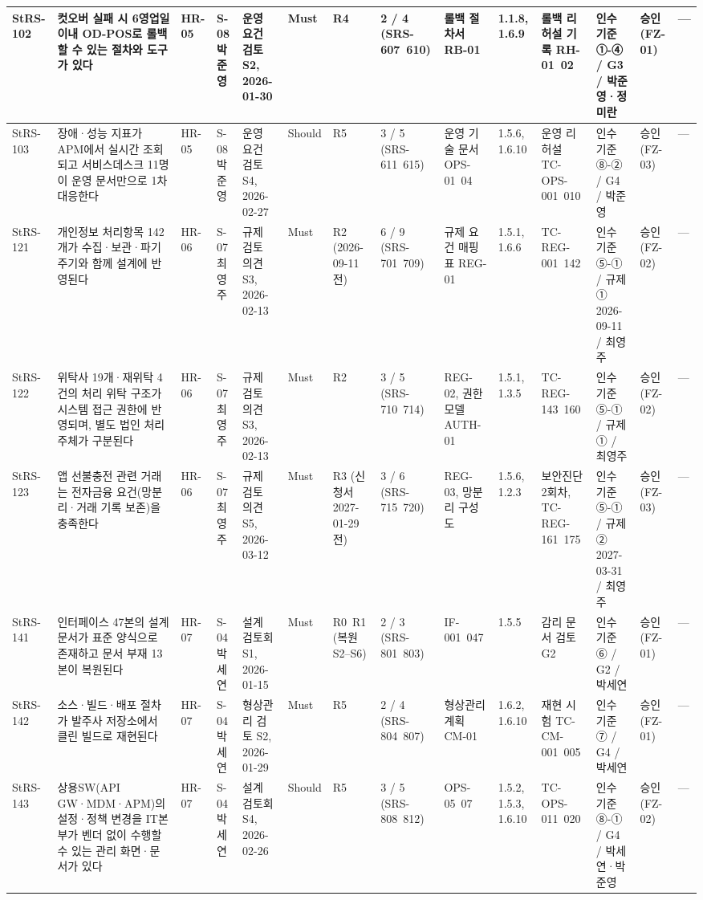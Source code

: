 \documentclass[10pt,a4paper]{article}
\begin{document}
{\begin{longtable}{|L{11mm}|L{42mm}|L{9mm}|L{15mm}|L{16mm}|L{11mm}|L{12mm}|L{15mm}|L{18mm}|L{12mm}|L{19mm}|L{22mm}|L{11mm}|L{22mm}|}
StRS-102 & 컷오버 실패 시 6영업일 이내 OD-POS로 롤백할 수 있는 절차와 도구가 있다 & HR-05 & S-08 박준영 & 운영 요건 검토 S2, 2026-01-30 & Must & R4 & 2 / 4 (SRS-607~610) & 롤백 절차서 RB-01 & 1.1.8, 1.6.9 & 롤백 리허설 기록 RH-01~02 & 인수 기준 ①-④ / G3 / 박준영·정미란 & 승인 (FZ-01) & — \\ \hline
StRS-103 & 장애·성능 지표가 APM에서 실시간 조회되고 서비스데스크 11명이 운영 문서만으로 1차 대응한다 & HR-05 & S-08 박준영 & 운영 요건 검토 S4, 2026-02-27 & Should & R5 & 3 / 5 (SRS-611~615) & 운영 기술 문서 OPS-01~04 & 1.5.6, 1.6.10 & 운영 리허설 TC-OPS-001~010 & 인수 기준 ⑧-② / G4 / 박준영 & 승인 (FZ-03) & — \\ \hline
StRS-121 & 개인정보 처리항목 142개가 수집·보관·파기 주기와 함께 설계에 반영된다 & HR-06 & S-07 최영주 & 규제 검토 의견 S3, 2026-02-13 & Must & R2 (2026-09-11 전) & 6 / 9 (SRS-701~709) & 규제 요건 매핑표 REG-01 & 1.5.1, 1.6.6 & TC-REG-001~142 & 인수 기준 ⑤-① / 규제 ① 2026-09-11 / 최영주 & 승인 (FZ-02) & — \\ \hline
StRS-122 & 위탁사 19개·재위탁 4건의 처리 위탁 구조가 시스템 접근 권한에 반영되며, 별도 법인 처리 주체가 구분된다 & HR-06 & S-07 최영주 & 규제 검토 의견 S3, 2026-02-13 & Must & R2 & 3 / 5 (SRS-710~714) & REG-02, 권한 모델 AUTH-01 & 1.5.1, 1.3.5 & TC-REG-143~160 & 인수 기준 ⑤-① / 규제 ① / 최영주 & 승인 (FZ-02) & — \\ \hline
StRS-123 & 앱 선불충전 관련 거래는 전자금융 요건(망분리·거래 기록 보존)을 충족한다 & HR-06 & S-07 최영주 & 규제 검토 의견 S5, 2026-03-12 & Must & R3 (신청서 2027-01-29 전) & 3 / 6 (SRS-715~720) & REG-03, 망분리 구성도 & 1.5.6, 1.2.3 & 보안진단 2회차, TC-REG-161~175 & 인수 기준 ⑤-① / 규제 ② 2027-03-31 / 최영주 & 승인 (FZ-03) & — \\ \hline
StRS-141 & 인터페이스 47본의 설계문서가 표준 양식으로 존재하고 문서 부재 13본이 복원된다 & HR-07 & S-04 박세연 & 설계 검토회 S1, 2026-01-15 & Must & R0~R1 (복원 S2–S6) & 2 / 3 (SRS-801~803) & IF-001~047 & 1.5.5 & 감리 문서 검토 G2 & 인수 기준 ⑥ / G2 / 박세연 & 승인 (FZ-01) & — \\ \hline
StRS-142 & 소스·빌드·배포 절차가 발주사 저장소에서 클린 빌드로 재현된다 & HR-07 & S-04 박세연 & 형상관리 검토 S2, 2026-01-29 & Must & R5 & 2 / 4 (SRS-804~807) & 형상관리 계획 CM-01 & 1.6.2, 1.6.10 & 재현 시험 TC-CM-001~005 & 인수 기준 ⑦ / G4 / 박세연 & 승인 (FZ-01) & — \\ \hline
StRS-143 & 상용SW(API GW·MDM·APM)의 설정·정책 변경을 IT본부가 벤더 없이 수행할 수 있는 관리 화면·문서가 있다 & HR-07 & S-04 박세연 & 설계 검토회 S4, 2026-02-26 & Should & R5 & 3 / 5 (SRS-808~812) & OPS-05~07 & 1.5.2, 1.5.3, 1.6.10 & TC-OPS-011~020 & 인수 기준 ⑧-① / G4 / 박세연·박준영 & 승인 (FZ-02) & — \\ \hline

\end{longtable}}
\end{document}
